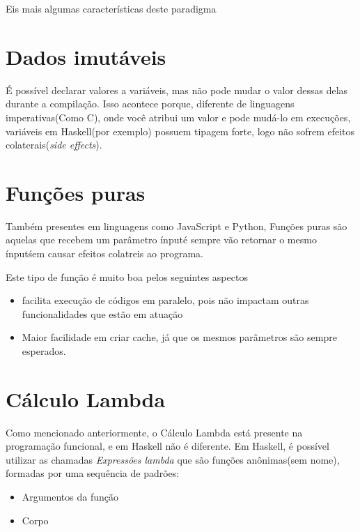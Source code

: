 \documentclass[
  12pt,				         %
  oneside,			       %
  a4paper,			       %
  english,		       	 %
  brazil,			      	 %
]{abntex2}
\begin{document}
    Eis mais algumas características deste paradigma

    \section{Dados imutáveis} 

    É possível declarar valores a variáveis, mas não pode mudar o valor dessas 
    delas durante a compilação. Isso acontece porque, diferente de linguagens imperativas(Como C), onde você
    atribui um valor e pode mudá-lo em execuções, variáveis em Haskell(por exemplo) possuem tipagem forte, logo 
    não sofrem efeitos colaterais(\emph{side effects}).

    \section{Funções puras}

    Também presentes em linguagens como JavaScript e Python, Funções puras são aquelas que recebem 
    um parâmetro \'input\' e sempre vão retornar o mesmo \'input\' sem causar efeitos colatreis
    ao programa.

    Este tipo de função é muito boa pelos seguintes aspectos
    
    \begin{itemize}
      \item facilita execução de códigos em paralelo, pois não impactam outras funcionalidades que estão em atuação
      \item Maior facilidade em criar cache, já que os mesmos parâmetros são sempre esperados.
    \end{itemize} 

    \newpage

    \section{Cálculo Lambda}
    
    Como mencionado anteriormente, o Cálculo Lambda está presente na programação funcional, e em Haskell não é diferente.
    Em Haskell, é possível utilizar as chamadas \emph{Expressões lambda} que são funções anônimas(sem nome), formadas por 
    uma sequência de padrões:

    \begin{itemize}
      \item Argumentos da função 
      \item Corpo
    \end{itemize}
\end{document}

